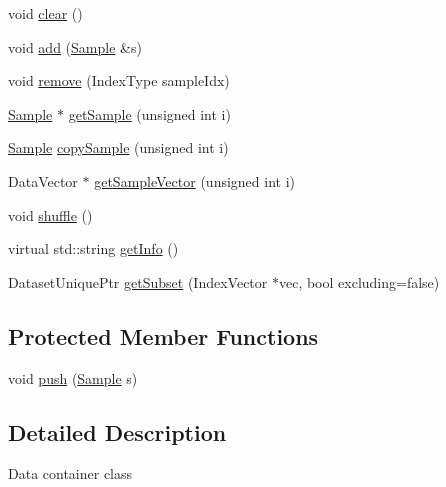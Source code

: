 \begin{DoxyCompactItemize}
\item 
void \hyperlink{classffactory_1_1_dataset_a2577ab7582afd11a22b05b0a7b33e470}{clear} ()
\item 
void \hyperlink{classffactory_1_1_dataset_a57862bb9ae4e77f217d1714ba0337d7c}{add} (\hyperlink{classffactory_1_1_sample}{Sample} \&s)
\item 
void \hyperlink{classffactory_1_1_dataset_a02e99a1c9c4a1bc52bda35705414d23f}{remove} (Index\-Type sample\-Idx)
\item 
\hyperlink{classffactory_1_1_sample}{Sample} $\ast$ \hyperlink{classffactory_1_1_dataset_a02aa634dccdde4e814b852b6a9123883}{get\-Sample} (unsigned int i)
\item 
\hyperlink{classffactory_1_1_sample}{Sample} \hyperlink{classffactory_1_1_dataset_a374a6c76e72fb99533cf8fc1c488a3e0}{copy\-Sample} (unsigned int i)
\item 
Data\-Vector $\ast$ \hyperlink{classffactory_1_1_dataset_adc0cba7d6fc2bbf0fa17b639e2dca2bc}{get\-Sample\-Vector} (unsigned int i)
\item 
void \hyperlink{classffactory_1_1_dataset_a4575aa266a4c8fa4358c786a90392cda}{shuffle} ()
\item 
virtual std\-::string \hyperlink{classffactory_1_1_dataset_a3017145c5f83813b81918aa0b2a9679b}{get\-Info} ()
\item 
Dataset\-Unique\-Ptr \hyperlink{classffactory_1_1_dataset_aae17a45d92581512d063c69d0d4ec938}{get\-Subset} (Index\-Vector $\ast$vec, bool excluding=false)
\end{DoxyCompactItemize}
\subsection*{Protected Member Functions}
\begin{DoxyCompactItemize}
\item 
void \hyperlink{classffactory_1_1_dataset_a42144aeec889715783787c840a6aec93}{push} (\hyperlink{classffactory_1_1_sample}{Sample} s)
\end{DoxyCompactItemize}


\subsection{Detailed Description}
Data container class 

